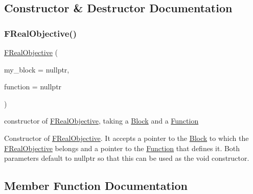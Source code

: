 \subsection{Constructor \& Destructor Documentation}
\mbox{\label{class_s_m_spp__di__unipi__it_1_1_f_real_objective_ac7f276033fd671a37ae57ac11d7763e7}} 
\subsubsection{\texorpdfstring{F\+Real\+Objective()}{FRealObjective()}}
{\footnotesize\ttfamily \mbox{\hyperlink{class_s_m_spp__di__unipi__it_1_1_f_real_objective}{F\+Real\+Objective}} (\begin{DoxyParamCaption}\item[{\mbox{\hyperlink{class_s_m_spp__di__unipi__it_1_1_block}{Block}} $\ast$}]{my\+\_\+block = {\ttfamily nullptr},  }\item[{\mbox{\hyperlink{class_s_m_spp__di__unipi__it_1_1_function}{Function}} $\ast$}]{function = {\ttfamily nullptr} }\end{DoxyParamCaption})\hspace{0.3cm}{\ttfamily [inline]}}



constructor of \mbox{\hyperlink{class_s_m_spp__di__unipi__it_1_1_f_real_objective}{F\+Real\+Objective}}, taking a \mbox{\hyperlink{class_s_m_spp__di__unipi__it_1_1_block}{Block}} and a \mbox{\hyperlink{class_s_m_spp__di__unipi__it_1_1_function}{Function}} 

Constructor of \mbox{\hyperlink{class_s_m_spp__di__unipi__it_1_1_f_real_objective}{F\+Real\+Objective}}. It accepts a pointer to the \mbox{\hyperlink{class_s_m_spp__di__unipi__it_1_1_block}{Block}} to which the \mbox{\hyperlink{class_s_m_spp__di__unipi__it_1_1_f_real_objective}{F\+Real\+Objective}} belongs and a pointer to the \mbox{\hyperlink{class_s_m_spp__di__unipi__it_1_1_function}{Function}} that defines it. Both parameters default to nullptr so that this can be used as the void constructor. 

\subsection{Member Function Documentation}
\mbox{\label{class_s_m_spp__di__unipi__it_1_1_f_real_objective_a9862fdd31593937c218bbda548c85fcc}} 
